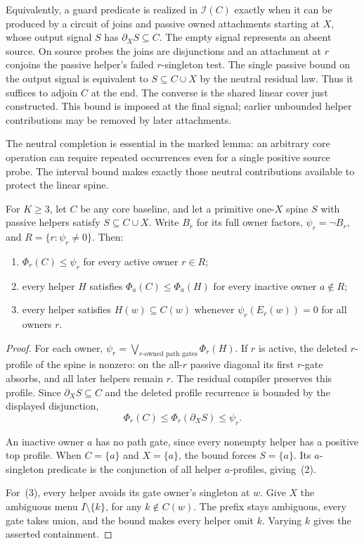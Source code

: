 Equivalently, a guard predicate is realized in
$\mathcal I(C)$ exactly when it can be produced
by a circuit of joins and passive owned
attachments starting at $X$, whose output
signal $S$ has $\partial_X S\subseteq C$.
The empty signal represents an absent source.
On source probes the joins are disjunctions
and an attachment at $r$ conjoins the passive
helper's failed $r$-singleton test. The single
passive bound on the output signal is equivalent
to $S\subseteq C\cup X$ by the neutral residual
law. Thus it suffices to adjoin $C$ at the end.
The converse is the shared linear cover just
constructed. This bound is imposed at the final
signal; earlier unbounded helper contributions
may be removed by later attachments.

The neutral completion is essential in the marked lemma: an arbitrary
core operation can require repeated occurrences even for a single positive
source probe. The interval bound makes exactly those neutral contributions
available to protect the linear spine.

\begin{lemma}
\label{core:lem:linear-profile-inheritance}
For $K\geq3$, let $C$ be any core baseline, and let a primitive one-$X$ spine $S$ with
passive helpers satisfy $S\subseteq C\cup X$. Write $B_r$ for its full
owner factors, $\psi_r=\neg B_r$, and $R=\{r:\psi_r\ne0\}$.
Then:
\begin{enumerate}
\item $\Phi_r(C)\leq\psi_r$ for every active owner $r\in R$;
\item every helper $H$ satisfies $\Phi_a(C)\leq\Phi_a(H)$ for every
  inactive owner $a\notin R$;
\item every helper satisfies $H(w)\subseteq C(w)$ whenever
  $\psi_r(E_r(w))=0$ for all owners $r$.
\end{enumerate}
\end{lemma}
\begin{proof}
For each owner,
$\psi_r=\bigvee_{\text{$r$-owned path gates}}\Phi_r(H)$.
If $r$ is active, the deleted $r$-profile of the spine is nonzero:
on the all-$r$ passive diagonal its first $r$-gate absorbs, and all later
helpers remain $r$. The residual compiler preserves this profile.
Since $\partial_XS\subseteq C$ and the deleted profile recurrence is
bounded by the displayed disjunction,
\[
 \Phi_r(C)\leq\Phi_r(\partial_XS)\leq\psi_r.
\]

An inactive owner $a$ has no path gate, since every nonempty helper
has a positive top profile. When $C=\{a\}$ and $X=\{a\}$,
the bound forces $S=\{a\}$. Its $a$-singleton predicate is the
conjunction of all helper $a$-profiles, giving~(2).

For~(3), every helper avoids its gate owner's singleton at $w$.
Give $X$ the ambiguous menu $I\setminus\{k\}$, for any $k\notin C(w)$.
The prefix stays ambiguous, every gate takes union, and the bound makes
every helper omit $k$. Varying $k$ gives the asserted containment.
\end{proof}

